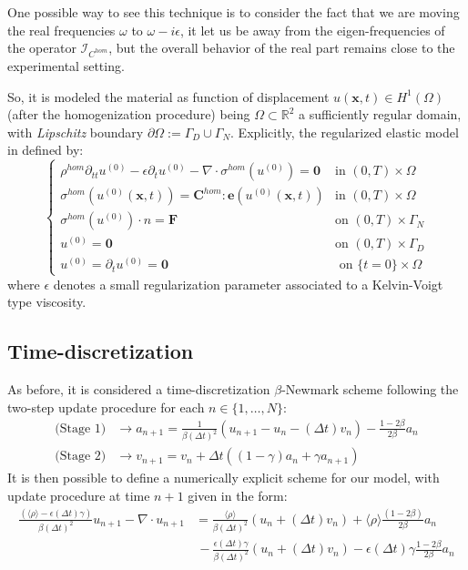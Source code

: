 \begin{rem}
One possible way to see this technique is to consider the fact that we are moving the real frequencies $\omega$ to $\omega - i\epsilon$, it let us be away from the eigen-frequencies of the operator $\mathcal{I}_{C^{hom}}$, but the overall behavior of the real part remains close to the experimental setting.
\end{rem}

So, it is modeled the material as function of displacement $u(\mathbf{x},t) \in H^{1}(\Omega)$ (after the homogenization procedure) being $\Omega \subset \mathbb{R}^2$ a sufficiently regular domain, with \textit{Lipschitz} boundary $\partial \Omega := \Gamma_D \cup \Gamma_N$. 
Explicitly, the regularized elastic model in defined by:
\begin{equation*}
    \left \{
    \begin{array}{cc}
        \rho^{hom} \partial_{tt} u^{(0)} - \epsilon \partial_{t} u^{(0)} - \nabla \cdot \sigma^{hom}(u^{(0)}) = \mathbf{0} & \text{in } (0,T)\times \Omega\\
        \sigma^{hom}(u^{(0)}(\mathbf{x},t)) =  \mathbf{C}^{hom}:\mathbf{e}(u^{(0)}(\mathbf{x},t))  & \text{in }(0,T)\times \Omega\\ 
        \sigma^{hom}(u^{(0)})\cdot n = \mathbf{F} & \text{on } (0,T)\times \Gamma_N\\
        u^{(0)} = \mathbf{0} & \text{on }(0,T)\times \Gamma_D \\
        u^{(0)} = \partial_t u^{(0)} = \mathbf{0}& \text{ on } \{t=0\}\times\Omega
    \end{array}
    \right .
\end{equation*}
where $\epsilon$ denotes a small regularization parameter associated to a Kelvin-Voigt type viscosity. 
\subsection{Time-discretization}
As before, it is considered a time-discretization $\beta$-Newmark scheme following the two-step update procedure for each $n \in \{1,\dots, N\}$:
\begin{align*}
    \text{(Stage 1)} &\longrightarrow a_{n+1} = \frac{1}{\beta (\Delta t)^2} (u_{n+1}-u_{n}-(\Delta t)v_n) - \frac{1-2\beta}{2\beta}a_n\\
    \text{(Stage 2)}& \longrightarrow v_{n+1} = v_n + \Delta t((1-\gamma)a_n + \gamma a_{n+1})
\end{align*}
It is then possible to define a numerically explicit scheme for our model, with update procedure at time $n+1$ given in the form:
\begin{align*}
    \frac{(\langle \rho \rangle- \epsilon (\Delta t) \gamma)}{\beta (\Delta t)^2} u_{n+1} - \nabla \cdot u_{n+1} &= \frac{\langle \rho \rangle}{\beta (\Delta t)^2} (u_n + (\Delta t)v_n) + \langle \rho \rangle\frac{ (1-2\beta)}{2\beta}a_n \\
    & \, - \frac{\epsilon (\Delta t)\gamma}{\beta (\Delta t)^2}(u_n + (\Delta t)v_n) - \epsilon (\Delta t)\gamma\frac{1-2\beta}{2 \beta} a_n
\end{align*}

